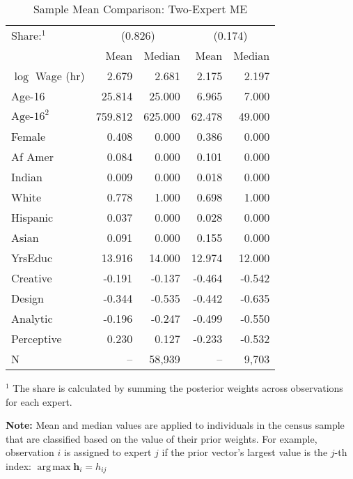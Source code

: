 \documentclass[12pt]{article}
\DeclareMathOperator*{\argmax}{arg\,max}
\theoremstyle{definition}
\begin{document}
  
  \begin{table} \centering
    \caption{Sample Mean Comparison: Two-Expert ME}
    \begin{threeparttable}
      \begin{tabular}[l]{l r r r r}
    \cmidrule{1-5}
    Share:$^{1}$& \multicolumn{2}{c}{(0.826)} & \multicolumn{2}{c}{(0.174)} \\
                & Mean & Median & Mean & Median \\
    \cmidrule{1-5}
    $\log$ Wage (hr)      &   2.679 &   2.681 &  2.175 &  2.197 \\
    Age-16                &  25.814 &  25.000 &  6.965 &  7.000 \\
    $\textrm{Age-16}^{2}$ & 759.812 & 625.000 & 62.478 & 49.000 \\
    Female                &   0.408 &   0.000 &  0.386 &  0.000 \\
    Af Amer               &   0.084 &   0.000 &  0.101 &  0.000 \\
    Indian                &   0.009 &   0.000 &  0.018 &  0.000 \\
    White                 &   0.778 &   1.000 &  0.698 &  1.000 \\
    Hispanic              &   0.037 &   0.000 &  0.028 &  0.000 \\
    Asian                 &   0.091 &   0.000 &  0.155 &  0.000 \\
    YrsEduc               &  13.916 &  14.000 & 12.974 & 12.000 \\
    Creative              &  -0.191 &  -0.137 & -0.464 & -0.542 \\
    Design                &  -0.344 &  -0.535 & -0.442 & -0.635 \\
    Analytic              &  -0.196 &  -0.247 & -0.499 & -0.550 \\
    Perceptive            &   0.230 &   0.127 & -0.233 & -0.532 \\
    \cmidrule{1-5}
    N                     &      -- &  58,939 &     -- &  9,703 \\
    \hline
      \end{tabular}
      \begin{tablenotes}
        \item{\footnotesize $^{1}$ The share is calculated by summing the 
        posterior weights across observations for each expert.}
        \item{\footnotesize \textbf{Note:} Mean and median values are applied to individuals
        in the census sample that are classified based on the value of their prior weights.
        For example, observation $i$ is assigned to expert $j$ if the prior vector's
        largest value is the $j$-th index: $\argmax \boldsymbol{h}_{i} = h_{ij}$}
      \end{tablenotes} \label{tbl:ME2_sample_comparison}
    \end{threeparttable}
  \end{table}
  
\end{document}
